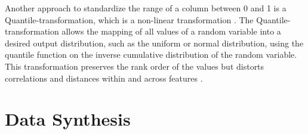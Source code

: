 Another approach to standardize the range of a column between 0 and 1 is a Quantile-transformation, which is a non-linear transformation \cite{scikit-learndevelopers2023PreprocessingData, kotelnikov2022TabDDPMModellingTabular}.
The Quantile-transformation allows the mapping of all values of a random variable into a desired output distribution, such as the uniform or normal distribution, 
using the quantile function on the inverse cumulative distribution of the random variable. 
This transformation preserves the rank order of the values but distorts correlations and distances within and across features \cite{scikit-learndevelopers2023PreprocessingData}.


\section{Data Synthesis}
\label{ch:preliminaries-dataSynthesis}

